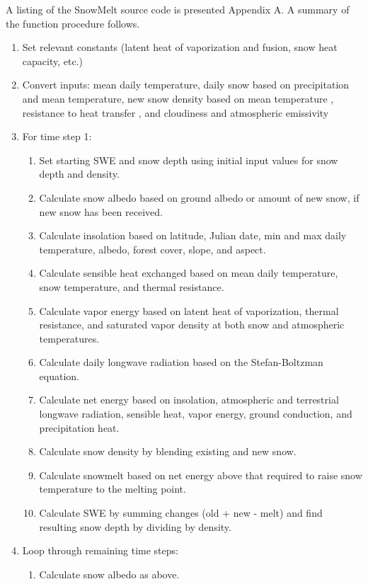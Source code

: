 \documentclass[12pt]{article}
\begin{document}
A listing of the SnowMelt source code is presented Appendix A.
A summary of the function procedure follows.
\begin{enumerate}
  \item Set relevant constants (latent heat of vaporization and fusion, snow heat capacity, etc.)
  \item Convert inputs: mean daily temperature, daily snow based on precipitation and mean temperature, new snow density based on mean temperature \citep{goodison1981measurement}, resistance to heat transfer \citep{campbell1977introduction}, and cloudiness and atmospheric emissivity \citep{fuka2014ecohydrology}
  \item For time step 1:
  \begin{enumerate}
    \item Set starting SWE and snow depth using initial input values for snow depth and density.
    \item Calculate snow albedo based on ground albedo or amount of new snow, if new snow has been received.
    \item Calculate insolation based on latitude, Julian date, min and max daily temperature, albedo, forest cover, slope, and aspect.
    \item Calculate sensible heat exchanged based on mean daily temperature, snow temperature, and thermal resistance.
    \item Calculate vapor energy based on latent heat of vaporization, thermal resistance, and saturated vapor density at both snow and atmospheric temperatures.
    \item Calculate daily longwave radiation based on the Stefan-Boltzman equation.
    \item Calculate net energy based on insolation, atmospheric and terrestrial longwave radiation, sensible heat, vapor energy, ground conduction, and precipitation heat.
    \item Calculate snow density by blending existing and new snow.
    \item Calculate snowmelt based on net energy above that required to raise snow temperature to the melting point.
    \item Calculate SWE by summing changes (old + new - melt) and find resulting snow depth by dividing by density.
  \end{enumerate}
  \item Loop through remaining time steps:
  \begin{enumerate}
    \item Calculate snow albedo as above.

\end{enumerate}
\end{enumerate}
\end{document}

